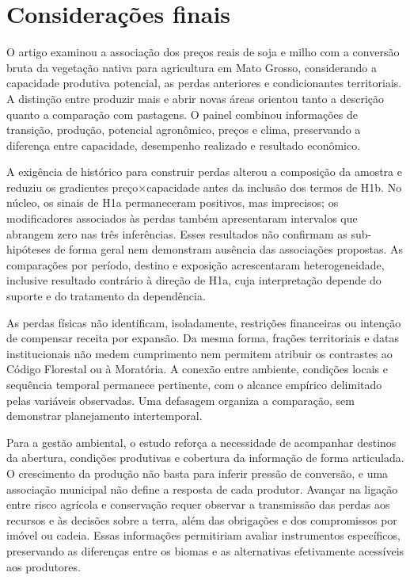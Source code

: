 \section{Considerações finais}
\label{sec:conclusao}

O artigo examinou a associação dos preços reais de soja e milho com a conversão bruta da vegetação nativa para agricultura em Mato Grosso, considerando a capacidade produtiva potencial, as perdas anteriores e condicionantes territoriais. A distinção entre produzir mais e abrir novas áreas orientou tanto a descrição quanto a comparação com pastagens. O painel combinou informações de transição, produção, potencial agronômico, preços e clima, preservando a diferença entre capacidade, desempenho realizado e resultado econômico.

A exigência de histórico para construir perdas alterou a composição da amostra e reduziu os gradientes preço×capacidade antes da inclusão dos termos de H1b. No núcleo, os sinais de H1a permaneceram positivos, mas imprecisos; os modificadores associados às perdas também apresentaram intervalos que abrangem zero nas três inferências. Esses resultados não confirmam as sub-hipóteses de forma geral nem demonstram ausência das associações propostas. As comparações por período, destino e exposição acrescentaram heterogeneidade, inclusive resultado contrário à direção de H1a, cuja interpretação depende do suporte e do tratamento da dependência.

As perdas físicas não identificam, isoladamente, restrições financeiras ou intenção de compensar receita por expansão. Da mesma forma, frações territoriais e datas institucionais não medem cumprimento nem permitem atribuir os contrastes ao Código Florestal ou à Moratória. A conexão entre ambiente, condições locais e sequência temporal permanece pertinente, com o alcance empírico delimitado pelas variáveis observadas. Uma defasagem organiza a comparação, sem demonstrar planejamento intertemporal.

Para a gestão ambiental, o estudo reforça a necessidade de acompanhar destinos da abertura, condições produtivas e cobertura da informação de forma articulada. O crescimento da produção não basta para inferir pressão de conversão, e uma associação municipal não define a resposta de cada produtor. Avançar na ligação entre risco agrícola e conservação requer observar a transmissão das perdas aos recursos e às decisões sobre a terra, além das obrigações e dos compromissos por imóvel ou cadeia. Essas informações permitiriam avaliar instrumentos específicos, preservando as diferenças entre os biomas e as alternativas efetivamente acessíveis aos produtores.

\FloatBarrier



